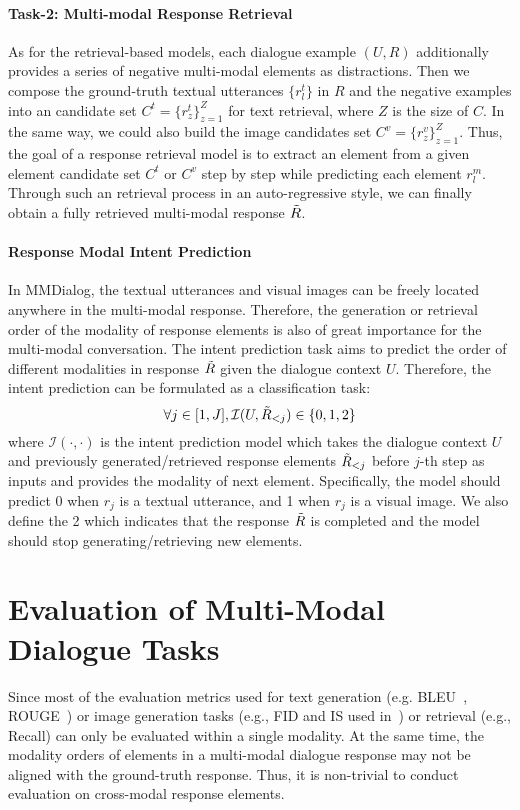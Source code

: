 \documentclass[11pt]{article}
\newcommand{\DataName}{MMDialog}
\begin{document}
\paragraph{Task-2: Multi-modal Response Retrieval}
As for the retrieval-based models, each dialogue example $(U, R)$ additionally provides a series of negative multi-modal elements as distractions. Then we compose the ground-truth textual utterances $\{ r^t_l\}$ in $R$ and the negative examples into an candidate set $C^t = \{ r^{t}_z\}_{z=1}^{Z}$ for text retrieval, where $Z$ is the size of $C$. In the same way, we could also build the image candidates set $C^v = \{ r^{v}_z\}_{z=1}^{Z}$. Thus, the goal of a response retrieval model is to extract an element from a given element candidate set $C^t$ or $C^v$ step by step while predicting each element $r^m_l$. Through such an  retrieval process in an auto-regressive style, we can finally obtain a fully retrieved multi-modal response $\Tilde{R}$.

\paragraph{Response Modal Intent Prediction}
In \DataName, the textual utterances and visual images can be freely located anywhere in the multi-modal response. Therefore, the generation or retrieval order of the modality of response elements is also of great importance for the multi-modal conversation. The intent prediction task aims to predict the order of different modalities in response $\Tilde{R}$ given the dialogue context $U$. Therefore, the intent prediction can be formulated as a classification task: 
\begin{equation}
    \forall j \in [1, J], \mathcal{I}(U, \Tilde{R}_{<j}) \in \{0, 1, 2\}
\end{equation}
where $\mathcal{I}(\cdot,\cdot)$ is the intent prediction model which takes the dialogue context $U$ and previously generated/retrieved response elements $\Tilde{R}_{<j}$ before $j$-th step as inputs and provides the modality of next element. Specifically, the model should predict 0 when $r_j$ is a textual utterance, and 1 when $r_j$ is a visual image. We also define the 2 which indicates that the response $\Tilde{R}$ is completed and the model should stop generating/retrieving new elements.





\section{Evaluation of Multi-Modal Dialogue Tasks}
Since most of the evaluation metrics used for text generation (e.g. BLEU~\cite{papineni-etal-2002-bleu}, ROUGE~\cite{lin-2004-rouge}) or image generation tasks (e.g., FID and IS used in~\citet{ramesh2021zero}) or retrieval (e.g., Recall) can only be evaluated within a single modality. At the same time, the modality orders of elements in a multi-modal dialogue response may not be aligned with the ground-truth response. Thus, it is non-trivial to conduct evaluation on cross-modal response elements. 
\end{document}
